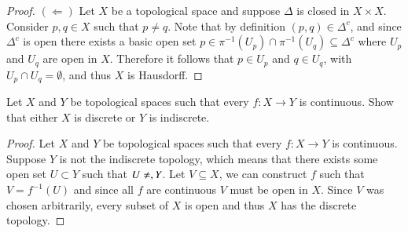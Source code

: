 \documentclass[minion]{homework651}
\begin{document}
\begin{problems}
\begin{proof} $(\Leftarrow)$ Let $X$ be a topological space and suppose $\Delta$ is closed in $X \times X$. Consider $p, q \in X$ such that $p \neq q$. Note that by definition $(p, q) \in \Delta^c$, and since $\Delta^c$ is open there exists a basic open set $p \in \pi^{-1}(U_p)\cap \pi^{-1}(U_q)\subseteq \Delta^c$ where $U_p$ and $U_q$ are open in $X$. Therefore it follows that $p \in U_p$ and $q \in U_q$, with $U_p \cap U_q = \emptyset$, and thus $X$ is Hausdorff. 
\end{proof}



\problem Let $X$ and $Y$ be topological spaces such that every $f:X \to Y$ is continuous. Show that either $X$ is discrete 
or $Y$ is indiscrete. 

\begin{proof} Let $X$ and $Y$ be topological spaces such that every $f:X \to Y$ is continuous. Suppose $Y$ is not the indiscrete topology, which 
    means that there exists some open set $U \subset Y$ such that $U \neq \empty, Y$. Let $V \subseteq X$, we can construct $f$ such that $V = f^{-1}(U)$ and since all $f$ are 
    continuous $V$ must be open in $X$. Since $V$ was chosen arbitrarily, every subset of $X$ is open and thus $X$ has the discrete topology.     
\end{proof}

\end{problems}
\end{document}
